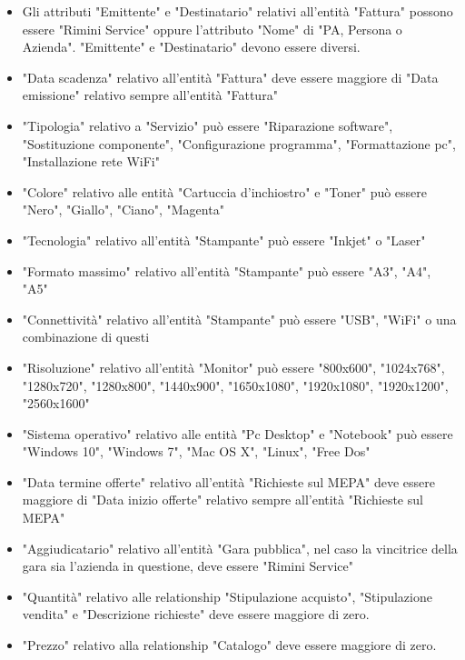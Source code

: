 
\begin{itemize}
\item Gli attributi "Emittente" e "Destinatario" relativi all'entità "Fattura" possono essere "Rimini Service" oppure l'attributo "Nome" di "PA, Persona o Azienda". "Emittente" e "Destinatario" devono essere diversi.
\item "Data scadenza" relativo all'entità "Fattura" deve essere maggiore di "Data emissione" relativo sempre all'entità "Fattura"
\item "Tipologia" relativo a "Servizio" può essere "Riparazione software", "Sostituzione componente", "Configurazione programma", "Formattazione pc", "Installazione rete WiFi"
\item "Colore" relativo alle entità "Cartuccia d'inchiostro" e "Toner" può essere "Nero", "Giallo", "Ciano", "Magenta"
\item "Tecnologia" relativo all'entità "Stampante" può essere "Inkjet" o "Laser"
\item "Formato massimo" relativo all'entità "Stampante" può essere "A3", "A4", "A5"
\item "Connettività" relativo all'entità "Stampante" può essere "USB", "WiFi" o una combinazione di questi
\item "Risoluzione" relativo all'entità "Monitor" può essere "800x600", "1024x768", "1280x720", "1280x800", "1440x900", "1650x1080", "1920x1080", "1920x1200", "2560x1600"
\item "Sistema operativo" relativo alle entità "Pc Desktop" e "Notebook" può essere "Windows 10", "Windows 7", "Mac OS X", "Linux", "Free Dos"
\item "Data termine offerte" relativo all'entità "Richieste sul MEPA" deve essere maggiore di "Data inizio offerte" relativo sempre all'entità "Richieste sul MEPA"
\item "Aggiudicatario" relativo all'entità "Gara pubblica", nel caso la vincitrice della gara sia l'azienda in questione, deve essere "Rimini Service"
\item "Quantità" relativo alle relationship "Stipulazione acquisto", "Stipulazione vendita" e "Descrizione richieste" deve essere maggiore di zero.
\item "Prezzo" relativo alla relationship "Catalogo" deve essere maggiore di zero.

\end{itemize}
